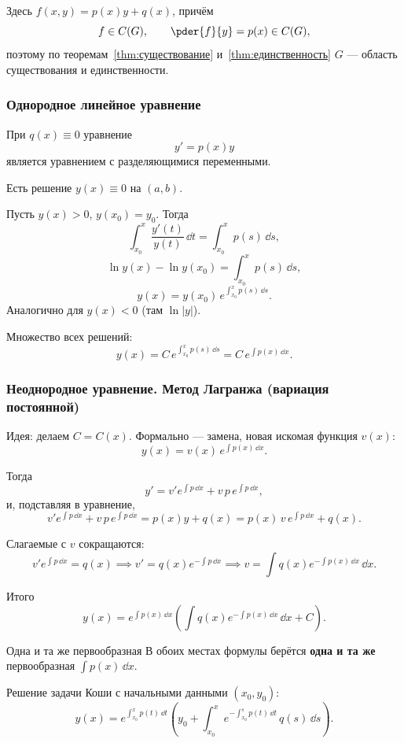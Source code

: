 Здесь $f(x,y) = p(x)y + q(x)$, причём
\[
f \in C(G), \qquad \pder{f}{y} = p(x) \in C(G),
\]
поэтому по теоремам~\ref{thm:существование} и~\ref{thm:единственность}
$G$ --- область существования и единственности.

\subsubsection*{Однородное линейное уравнение}

При $q(x) \equiv 0$ уравнение
\[
y' = p(x)y
\]
является уравнением с разделяющимися переменными.

Есть решение $y(x) \equiv 0$ на $(a,b)$.

Пусть $y(x) > 0$, $y(x_0) = y_0$. Тогда
\[
\int_{x_0}^{x}\frac{y'(t)}{y(t)}\,\dd t = \int_{x_0}^{x} p(s)\,\dd s,
\]
\[
\ln y(x) - \ln y(x_0) = \int_{x_0}^{x} p(s)\,\dd s,
\]
\[
y(x) = y(x_0)\,e^{\int_{x_0}^{x} p(s)\,\dd s}.
\]
Аналогично для $y(x) < 0$ (там $\ln|y|$).

Множество всех решений:
\[
y(x) = C\,e^{\int_{x_0}^{x} p(s)\,\dd s} = C\,e^{\int p(x)\,\dd x}.
\]

\subsubsection*{Неоднородное уравнение. Метод Лагранжа (вариация постоянной)}

Идея: делаем $C = C(x)$. Формально --- замена, новая искомая функция $v(x)$:
\[
y(x) = v(x)\,e^{\int p(x)\,\dd x}.
\]

Тогда
\[
y' = v'e^{\int p\,\dd x} + v\,p\,e^{\int p\,\dd x},
\]
и, подставляя в уравнение,
\[
v'e^{\int p\,\dd x} + v\,p\,e^{\int p\,\dd x}
= p(x)y + q(x) = p(x)\,v\,e^{\int p\,\dd x} + q(x).
\]

Слагаемые с $v$ сокращаются:
\[
v'e^{\int p\,\dd x} = q(x)
\implies v' = q(x)e^{-\int p\,\dd x}
\implies v = \int q(x)e^{-\int p(x)\,\dd x}\,\dd x.
\]

Итого
\[
y(x) = e^{\int p(x)\,\dd x}\left(\int q(x)e^{-\int p(x)\,\dd x}\,\dd x + C\right).
\]

\begin{Remark}{Одна и та же первообразная}{}
	В обоих местах формулы берётся \textbf{одна и та же} первообразная
	$\int p(x)\,\dd x$.
\end{Remark}

Решение задачи Коши с начальными данными $(x_0,y_0)$:
\[
y(x) = e^{\int_{x_0}^{x} p(t)\,\dd t}
\left(y_0 + \int_{x_0}^{x} e^{-\int_{x_0}^{s} p(t)\,\dd t}\,q(s)\,\dd s\right).
\]

